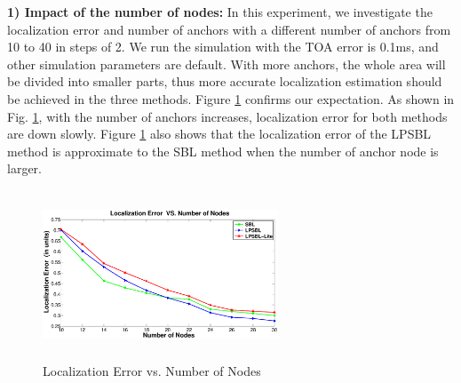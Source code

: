 \textbf{1) Impact of the number of nodes:}
 In this experiment, we investigate the localization error and number of anchors with a different number of anchors from 10 to 40 in steps of 2. 
 We run the simulation with the TOA error is 0.1ms, and other simulation parameters are default. 
 With more anchors, the whole area will be divided into smaller parts, 
 thus more accurate localization estimation should be achieved in the three methods. 
Figure \ref{Nodenumbers} confirms our expectation. As shown in Fig. \ref{Nodenumbers}, with the number of anchors increases, localization error for both  methods are down slowly. 
Figure \ref{Nodenumbers} also shows that the localization error of the LPSBL method is approximate to the SBL method when the number of anchor node is larger.
  \begin{figure}[htb]
            \setlength{\abovecaptionskip}{0pt}
            \centering
			 \vspace{-3mm}
           		 \includegraphics[height=5.0cm,width=7.0cm]{image/Nodenumbers.eps}
            \caption{Localization Error vs. Number of Nodes}
             \vspace{-5mm}
             \label{Nodenumbers}
        \end{figure}	
		
